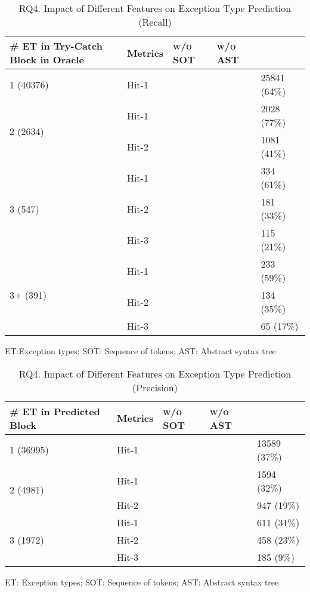 \begin{table}[t]
	\caption{RQ4. Impact of Different Features on Exception Type Prediction (Recall)}
	\tabcolsep 2pt
	{\small
		\begin{center}
			\renewcommand{\arraystretch}{1}
			\begin{tabular}{p{2cm}<{\centering}|p{1cm}<{\centering}|p{1.5cm}<{\centering}|p{1.5cm}<{\centering}|p{1.5cm}<{\centering}}
				\hline
				\# ET in Try-Catch Block in Oracle & Metrics &{\textsc{\tool w/o SOT}\xspace}&{\textsc{\tool w/o AST}\xspace}& {\textsc{\tool}\xspace} \\
				\hline
				\multirow{1}{*}{1 (40376)}   & Hit-1  &&& 25841 (64\%) \\
				\hline
				\multirow{2}{*}{2 (2634)}  & Hit-1   &&& 2028 (77\%) \\
				& Hit-2         &&&  1081 (41\%) \\
				\hline
				\multirow{3}{*}{3 (547)}  & Hit-1    &&& 334 (61\%) \\
				& Hit-2     &&& 181 (33\%)\\
				& Hit-3     &&& 115 (21\%) \\
				\hline
				\multirow{4}{*}{3+ (391)}  & Hit-1   &&& 233 (59\%) \\
				& Hit-2     &&& 134 (35\%) \\
				& Hit-3     &&& 65 (17\%)\\
				\hline
			\end{tabular}
		ET:Exception types; SOT: Sequence of tokens; AST: Abstract syntax tree		
			\label{tab:sensi-xtype-recall}
		\end{center}
	}
\end{table}

\begin{table}[t]
	\caption{RQ4. Impact of Different Features on Exception Type Prediction (Precision)}
	\vspace{-10pt}
	\tabcolsep 2pt
	{\small
		\begin{center}
			\renewcommand{\arraystretch}{1}
			\begin{tabular}{p{2cm}<{\centering}|p{1cm}<{\centering}|p{1.5cm}<{\centering}|p{1.5cm}<{\centering}|p{1.5cm}<{\centering}}
				\hline
				\# ET in Predicted \code{Try-Catch} Block & Metrics &{\textsc{\tool w/o SOT}\xspace}&{\textsc{\tool w/o AST}\xspace}& {\textsc{\tool}\xspace} \\
				\hline
				\multirow{1}{*}{1 (36995)}   & Hit-1  &&& 13589 (37\%) \\
				\hline
				\multirow{2}{*}{2 (4981)}  & Hit-1   &&& 1594 (32\%) \\
				& Hit-2       						&&& 947 (19\%) \\
				\hline
				\multirow{3}{*}{3 (1972)}  & Hit-1   && & 611 (31\%) \\
				& Hit-2         					&&& 458 (23\%)\\
				& Hit-3         				  	&&& 185 (9\%) \\
				\hline
			\end{tabular}
		ET: Exception types; SOT: Sequence of tokens; AST: Abstract syntax tree
			\label{tab:sensi-xtype-precision}
		\end{center}
	}
\end{table}


